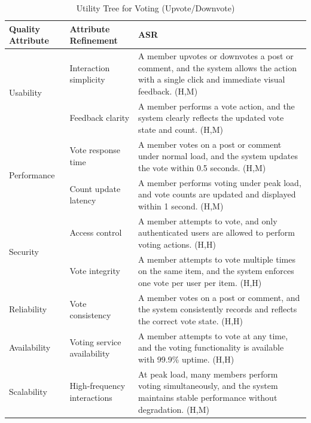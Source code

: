 \documentclass{article}
\begin{document}
\begin{table}[H]
\centering
\caption{Utility Tree for Voting (Upvote/Downvote)}
\begin{tabular}{|p{3cm}|p{4cm}|p{7cm}|}
\hline
\textbf{Quality Attribute} & \textbf{Attribute Refinement} & \textbf{ASR} \\
\hline

\multirow{2}{*}{Usability}
& Interaction simplicity
& A member upvotes or downvotes a post or comment, and the system allows the action with a single click and immediate visual feedback. (H,M) \\
\cline{2-3}
& Feedback clarity
& A member performs a vote action, and the system clearly reflects the updated vote state and count. (H,M) \\
\hline

\multirow{2}{*}{Performance}
& Vote response time
& A member votes on a post or comment under normal load, and the system updates the vote within 0.5 seconds. (H,M) \\
\cline{2-3}
& Count update latency
& A member performs voting under peak load, and vote counts are updated and displayed within 1 second. (H,M) \\
\hline

\multirow{2}{*}{Security}
& Access control
& A member attempts to vote, and only authenticated users are allowed to perform voting actions. (H,H) \\
\cline{2-3}
& Vote integrity
& A member attempts to vote multiple times on the same item, and the system enforces one vote per user per item. (H,H) \\
\hline

Reliability
& Vote consistency
& A member votes on a post or comment, and the system consistently records and reflects the correct vote state. (H,H) \\
\hline

Availability
& Voting service availability
& A member attempts to vote at any time, and the voting functionality is available with 99.9\% uptime. (H,H) \\
\hline

Scalability
& High-frequency interactions
& At peak load, many members perform voting simultaneously, and the system maintains stable performance without degradation. (H,M) \\
\hline

\end{tabular}
\end{table}
\end{document}
